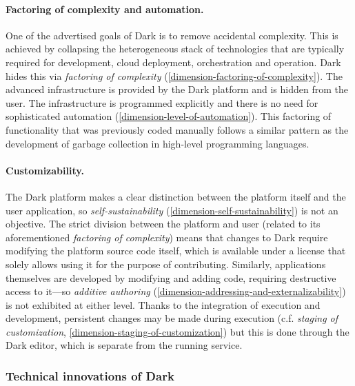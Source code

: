 \documentclass[english,submission]{programming}
\begin{document}
\paragraph{Factoring of complexity and automation.}

One of the advertised goals of Dark is to remove accidental complexity.
This is achieved by collapsing the heterogeneous stack of technologies
that are typically required for development, cloud deployment,
orchestration and operation. Dark hides this via \emph{factoring of
complexity} (\ref{dimension-factoring-of-complexity}). The advanced
infrastructure is provided by the Dark platform and is hidden from the
user. The infrastructure is programmed explicitly and there is no need
for sophisticated automation (\ref{dimension-level-of-automation}). This
factoring of functionality that was previously coded manually follows a
similar pattern as the development of garbage collection in high-level
programming languages.

\paragraph{Customizability.}

The Dark platform makes a clear distinction between the platform itself
and the user application, so \emph{self-sustainability}
(\ref{dimension-self-sustainability}) is not an objective. The strict
division between the platform and user (related to its aforementioned
\emph{factoring of complexity}) means that changes to Dark require
modifying the platform source code itself, which is available under a
license that solely allows using it for the purpose of contributing.
Similarly, applications themselves are developed by modifying and adding
code, requiring destructive access to it---so \emph{additive authoring}
(\ref{dimension-addressing-and-externalizability}) is not exhibited at
either level. Thanks to the integration of execution and development,
persistent changes may be made during execution (c.f. \emph{staging of
customization}, \ref{dimension-staging-of-customization}) but this is
done through the Dark editor, which is separate from the running
service.

\hypertarget{technical-innovations-of-dark}{%
\subsubsection{Technical innovations of
Dark}\label{technical-innovations-of-dark}}
\end{document}

